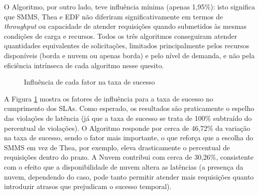 O Algoritmo, por outro lado, teve influência mínima (apenas 1,95\%): isto significa que SMMS, Thea e EDF não diferiram significativamente em termos de \textit{throughput} ou capacidade de atender requisições quando submetidos às mesmas condições de carga e recursos. Todos os três algoritmos conseguiram atender quantidades equivalentes de solicitações, limitados principalmente pelos recursos disponíveis (borda e nuvem ou apenas borda) e pelo nível de demanda, e não pela eficiência intrínseca de cada algoritmo nesse quesito.


\begin{figure}[ht!]
    \centering
    \footnotesize

    \caption{Influência de cada fator na taxa de sucesso}
    \label{fig:influence_success}
\end{figure}

A Figura \ref{fig:influence_success} mostra os fatores de influência para a taxa de sucesso no cumprimento dos SLAs. Como esperado, os resultados são praticamente o espelho das violações de latência (já que a taxa de sucesso se trata de 100\% subtraído do percentual de violações). O Algoritmo responde por cerca de 46,72\% da variação na taxa de sucesso, sendo o fator mais importante, o que reforça que a escolha do SMMS em vez de Thea, por exemplo, eleva drasticamente o percentual de requisições dentro do prazo. A Nuvem contribui com cerca de 30,26\%, consistente com o efeito que a disponibilidade de nuvem altera as latências (a presença da nuvem, dependendo do caso, pode tanto permitir atender mais requisições quanto introduzir atrasos que prejudicam o sucesso temporal).

